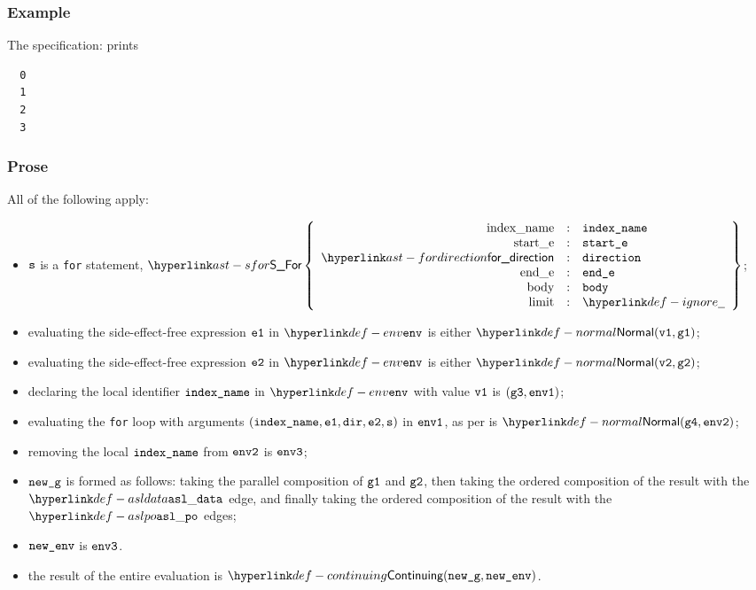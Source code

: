 \subsubsection{Example}
The specification:
prints
\begin{Verbatim}
  0
  1
  2
  3
\end{Verbatim}

\subsubsection{Prose}
All of the following apply:
\begin{itemize}
  \item $\texttt{s}$ is a \texttt{for} statement, $\SFor\left\{\begin{array}{rcl}
    \Forindexname &:& \vindexname\\
    \Forstarte &:& \vstarte\\
    \fordirection &:& \vdirection\\
    \Forende &:& \vende\\
    \Forbody &:& \vbody\\
    \Forlimit &:& \Ignore
  \end{array}\right\}$;
  \item evaluating the side-effect-free expression $\texttt{e1}$ in $\env$ is either
  $\Normal(\vvone, \vgone)$\ProseOrError;
  \item evaluating the side-effect-free expression $\texttt{e2}$ in $\env$ is either
  $\Normal(\vvtwo, \vgtwo)$\ProseOrError;
  \item declaring the local identifier $\texttt{index\_name}$ in $\env$ with value $\texttt{v1}$ is $(\texttt{g3}, \texttt{env1})$;
  \item evaluating the \texttt{for} loop with arguments $(\texttt{index\_name}, \texttt{e1}, \texttt{dir}, \texttt{e2}, \texttt{s})$ in $\texttt{env1}$,
  as per  is $\Normal(\vgfour, \envtwo)$\ProseOrAbnormal;
  \item removing the local $\texttt{index\_name}$ from $\texttt{env2}$ is $\texttt{env3}$;
  \item $\texttt{new\_g}$ is formed as follows: taking the parallel composition of $\texttt{g1}$ and $\texttt{g2}$,
  then taking the ordered composition of the result with the $\asldata$ edge,
  and finally taking the ordered composition of the result with the $\aslpo$ edges;
  \item $\texttt{new\_env}$ is $\texttt{env3}$.
  \item the result of the entire evaluation is $\Continuing(\newg, \newenv)$.
\end{itemize}
